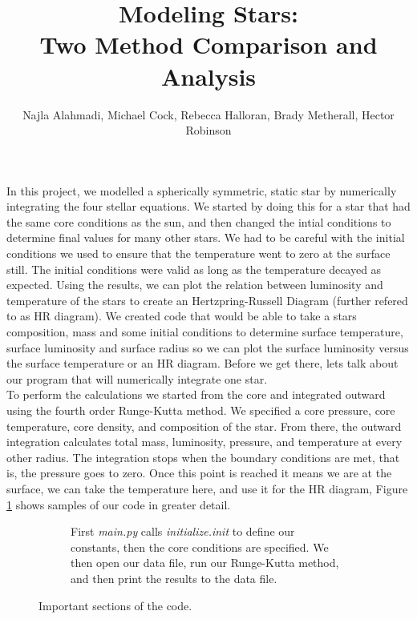 \documentclass[10pt]{article}
\title{Modeling Stars: \\ Two Method Comparison and Analysis}
\author{Najla Alahmadi, Michael Cock, Rebecca Halloran, Brady Metherall, Hector Robinson}
\begin{document}
\maketitle

\lstset{style=mystyle}

In this project, we modelled a spherically symmetric, static star by numerically integrating the four stellar equations. We started by doing this for a star that had the same core conditions as the sun, and then changed the intial conditions to determine final values for many other stars. We had to be careful with the initial conditions we used to ensure that the temperature went to zero at the surface still. The initial conditions were valid as long as the temperature decayed as expected. Using the results, we can plot the relation between luminosity and temperature of the stars to create an Hertzpring-Russell Diagram (further refered to as HR diagram). We created code that would be able to take a stars composition, mass and some initial conditions to determine surface temperature, surface luminosity and surface radius so we can plot the surface luminosity versus the surface temperature or an HR diagram. Before we get there, lets talk about our program that will numerically integrate one star. \\

To perform the calculations we started from the core and integrated outward using the fourth order Runge-Kutta method. We specified a core pressure, core temperature, core density, and composition of the star. From there, the outward integration calculates total mass, luminosity, pressure, and temperature at every other radius. The integration stops when the boundary conditions are met, that is, the pressure goes to zero. Once this point is reached it means we are at the surface, we can take the temperature here, and use it for the HR diagram, Figure \ref{fig:code} shows samples of our code in greater detail. \\

\begin{figure}[htbp]

 \begin{subfigure}{\textwidth}
  
  
  
  
  \caption{First \emph{main.py} calls \emph{initialize.init} to define our constants, then the core conditions are specified. We then open our data file, run our Runge-Kutta method, and then print the results to the data file.}
 \end{subfigure}
 \caption{Important sections of the code.}
 \label{fig:code}
\end{figure}
\end{document}
